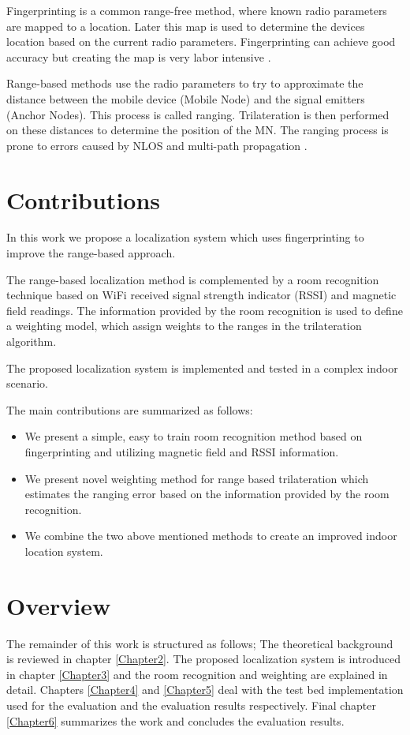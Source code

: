 Fingerprinting is a common range-free method, where known radio parameters are mapped to a location. Later this map is used to determine the devices location based on the current radio parameters. Fingerprinting can achieve good accuracy but creating the map is very labor intensive \cite{FineGrainedIndoorTracking}.

Range-based methods use the radio parameters to try to approximate the distance between the mobile device (Mobile Node) and the signal emitters (Anchor Nodes). This process is called ranging. Trilateration is then performed on these distances to determine the position of the MN. The ranging process is prone to errors caused by NLOS and multi-path propagation \cite{FineGrainedIndoorTracking}.

\section{Contributions}

In this work we propose a localization system which uses fingerprinting to improve the range-based approach.

The range-based localization method is complemented by a room recognition technique based on WiFi received signal strength indicator (RSSI) and magnetic field readings. The information provided by the room recognition is used to define a weighting model, which assign weights to the ranges in the trilateration algorithm.

The proposed localization system is implemented and tested in a complex indoor scenario.

The main contributions are summarized as follows:
\begin{itemize}
\item We present a simple, easy to train room recognition method based on fingerprinting and utilizing magnetic field and RSSI information.
\item We present novel weighting method for range based trilateration which estimates the ranging error based on the information provided by the room recognition.
\item We combine the two above mentioned methods to create an improved indoor location system.
\end{itemize}

\section{Overview}

The remainder of this work is structured as follows; The theoretical background is reviewed in chapter \ref{Chapter2}. The proposed localization system is introduced in chapter \ref{Chapter3} and the room recognition and weighting are explained in detail. Chapters \ref{Chapter4} and \ref{Chapter5} deal with the test bed implementation used for the evaluation and the evaluation results respectively. Final chapter \ref{Chapter6} summarizes the work and concludes the evaluation results.
